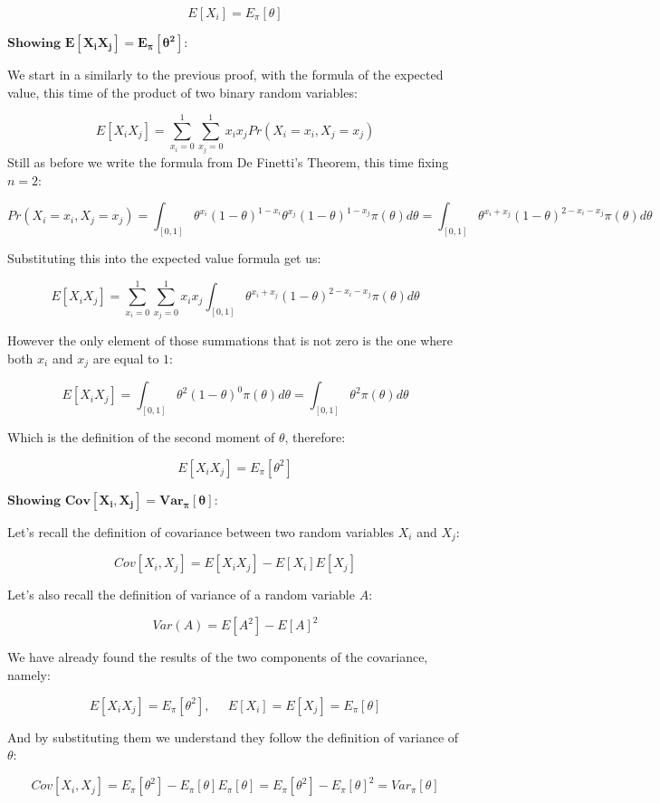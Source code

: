 \documentclass[
]{article}
\begin{document}
\[
E[X_i] = E_\pi[\theta]
\]

\(\textbf{Showing } \mathbf{E[X_iX_j]=E_{\pi}[\theta^2]}\):

We start in a similarly to the previous proof, with the formula of the
expected value, this time of the product of two binary random variables:

\[
E[X_iX_j] = 
\sum_{x_i=0}^1\sum_{x_j=0}^1x_ix_jPr(X_i=x_i,X_j=x_j)
\] Still as before we write the formula from De Finetti's Theorem, this
time fixing \(n = 2\):

\[
Pr(X_i=x_i,X_j=x_j) = \int_{[0,1]} \theta^{x_i}(1 - \theta)^{1 - x_i} \theta^{x_j}(1 - \theta)^{1 - x_j} \pi(\theta)d\theta
= \int_{[0,1]} \theta^{x_i + x_j}(1 - \theta)^{2 - x_i - x_j} \pi(\theta)d\theta
\]

Substituting this into the expected value formula get us:

\[
E[X_iX_j] =
\sum_{x_i=0}^1\sum_{x_j=0}^1x_ix_j\int_{[0,1]} \theta^{x_i + x_j}(1 - \theta)^{2 - x_i - x_j} \pi(\theta)d\theta
\]

However the only element of those summations that is not zero is the one
where both \(x_i\) and \(x_j\) are equal to \(1\):

\[
E[X_iX_j] = \int_{[0,1]} \theta^{2}(1 - \theta)^{0} \pi(\theta)d\theta
= \int_{[0,1]} \theta^{2} \pi(\theta)d\theta
\]

Which is the definition of the second moment of \(\theta\), therefore:

\[
E[X_iX_j] = E_\pi[\theta^2]
\]

\(\textbf{Showing } \mathbf{Cov[X_i,X_j]=Var_{\pi}[\theta]}\):

Let's recall the definition of covariance between two random variables
\(X_i\) and \(X_j\):

\[
Cov[X_i,X_j] = E[X_iX_j]-E[X_i]E[X_j]
\]

Let's also recall the definition of variance of a random variable \(A\):

\[
Var(A) = E[A^2] - E[A]^2
\]

We have already found the results of the two components of the
covariance, namely:

\[
E[X_iX_j] = E_\pi[\theta^2], \;\;\;\;\;
E[X_i] = E[X_j] = E_\pi[\theta]
\]

And by substituting them we understand they follow the definition of
variance of \(\theta\):

\[
Cov[X_i,X_j] = E_\pi[\theta^2] - E_\pi[\theta]E_\pi[\theta]
= E_\pi[\theta^2] - E_\pi[\theta]^2
= Var_\pi[\theta]
\]
\end{document}
